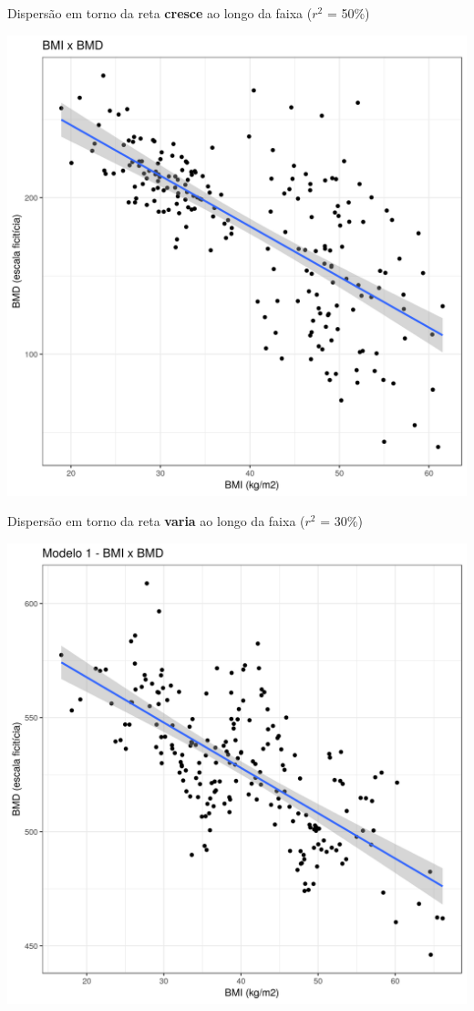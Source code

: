 \documentclass{beamer}
\begin{document}
\begin{frame}{\small Dispersão em torno da reta {\bf cresce} ao longo da faixa ($r^2$ = 50\%)}
  \begin{center}
    \includegraphics[height=.9\textheight]{Cap18-19/pratica-rls-het}
  \end{center}
\end{frame}

\begin{frame}{\small Dispersão em torno da reta {\bf varia} ao longo da faixa ($r^2$ = 30\%)}
  \begin{center}
    \includegraphics[height=.9\textheight]{Cap31-32/pratica-rlm1}
  \end{center}
\end{frame}
\end{document}
